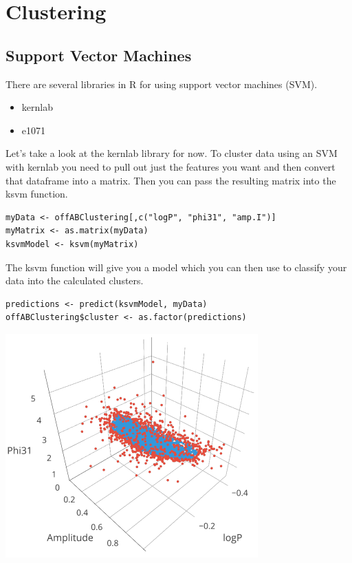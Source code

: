 \chapter{Clustering}

\section{Support Vector Machines}
There are several libraries in R for using support vector machines (SVM).

\begin{itemize}
	\item kernlab
	\item e1071
\end{itemize}

Let's take a look at the kernlab library for now. To cluster data using an SVM with kernlab you need to pull out just the features you want and then convert that dataframe into a matrix. Then you can pass the resulting matrix into the ksvm function.

\begin{verbatim}
myData <- offABClustering[,c("logP", "phi31", "amp.I")]
myMatrix <- as.matrix(myData)
ksvmModel <- ksvm(myMatrix)
\end{verbatim}

The ksvm function will give you a model which you can then use to classify your data into the calculated clusters.

\begin{verbatim}
predictions <- predict(ksvmModel, myData)
offABClustering$cluster <- as.factor(predictions)
\end{verbatim}

\includegraphics[]{images/ksvm_01.png}

